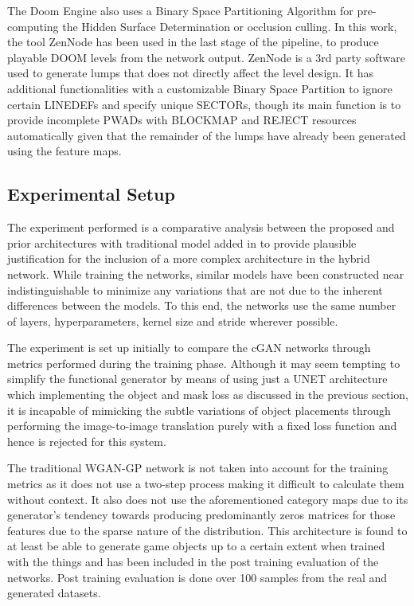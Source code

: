 \documentclass{Configuration_Files/PoliMi3i_thesis}
\begin{document}
The Doom Engine also uses a Binary Space Partitioning Algorithm for pre-computing 
the Hidden Surface Determination or occlusion culling. In this work, the 
tool ZenNode \cite{MaR04} has been used in the last stage of the pipeline, to produce playable 
DOOM levels from the network output. ZenNode is a 3rd party software used to 
generate lumps that does not directly affect the level design. It has additional 
functionalities with a customizable Binary Space Partition to ignore certain 
LINEDEFs and specify unique SECTORs, though its main function is to provide 
incomplete PWADs with BLOCKMAP and REJECT resources automatically given 
that the remainder of the lumps have already been generated using the feature maps.

\subsection{Experimental Setup}
The experiment performed is a comparative analysis between the proposed and prior 
architectures with traditional model added in to provide plausible justification for 
the inclusion of a more complex architecture in the hybrid network. While training 
the networks, similar models have been constructed near indistinguishable to 
minimize any variations that are not due to the inherent differences between the 
models. To this end, the networks use the same number of layers, hyperparameters, 
kernel size and stride wherever possible. 

The experiment is set up initially to compare the cGAN networks through metrics 
performed during the training phase. Although it may seem tempting to simplify the 
functional generator by means of using just a UNET architecture which implementing the 
object and mask loss as discussed in the previous section, it is incapable of mimicking 
the subtle variations of object placements through performing the image-to-image 
translation purely with a fixed loss function and hence is rejected for this system.

The traditional WGAN-GP network is not taken into account for the training metrics as it does not 
use a two-step process making it difficult to calculate them without context. It also 
does not use the aforementioned category maps due to its generator’s tendency 
towards producing predominantly zeros matrices for those features due to the sparse 
nature of the distribution. This architecture is found to at least be able to generate 
game objects up to a certain extent when trained with the things and has been 
included in the post training evaluation of the networks. Post training evaluation is 
done over 100 samples from the real and generated datasets.
\end{document}

